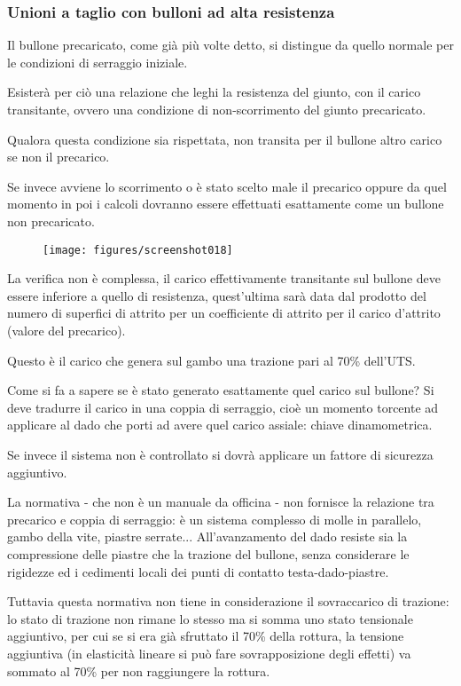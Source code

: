 \documentclass[a4paper, 15pt]{article}
\begin{document}
\subsubsection{Unioni a taglio con bulloni ad alta resistenza}
\begin{adjustwidth}{2in}{}	
	Il bullone precaricato, come già più volte detto, si distingue da quello normale per le condizioni di serraggio iniziale. 
	
	Esisterà per ciò una relazione che leghi la resistenza del giunto, con il carico transitante, ovvero una condizione di non-scorrimento del giunto precaricato. 
	
	Qualora questa condizione sia rispettata, non transita per il bullone altro carico se non il precarico. 
	
	Se invece avviene lo scorrimento o è stato scelto male il precarico oppure da quel momento in poi i calcoli dovranno essere effettuati esattamente come un bullone non precaricato. 
	\begin{figure}[H]
		\centering
		\texttt{[image: figures/screenshot018]}
		\label{fig:screenshot018}
	\end{figure}
	La verifica non è complessa, il carico  effettivamente transitante sul bullone deve essere inferiore a quello di resistenza, quest'ultima sarà data dal prodotto del numero di superfici di attrito per un coefficiente di attrito per il carico d'attrito (valore del precarico).
	
	Questo è il carico che genera sul gambo una trazione pari al 70\% dell'UTS.  \newline 
	
	Come si fa a sapere se è stato generato esattamente quel carico sul bullone? Si deve tradurre il carico in una coppia di serraggio, cioè un momento torcente ad applicare al dado che porti ad avere quel carico assiale: chiave dinamometrica. 
	
	Se invece il sistema non è controllato si dovrà applicare un fattore di sicurezza aggiuntivo. \newline 
	
	La normativa - che non è un manuale da officina - non fornisce la relazione tra precarico e coppia di serraggio: è un sistema complesso di molle in parallelo, gambo della vite, piastre serrate... All'avanzamento del dado resiste sia la compressione delle  piastre che la trazione del bullone, senza considerare le rigidezze ed i cedimenti locali dei punti di contatto testa-dado-piastre. \newline
	
	Tuttavia questa normativa non tiene in considerazione il sovraccarico di trazione: lo stato di trazione non rimane lo stesso ma si somma uno stato tensionale aggiuntivo, per cui se si era già sfruttato il 70\% della rottura, la tensione aggiuntiva (in elasticità lineare si può fare sovrapposizione degli effetti)  va sommato al 70\% per non raggiungere la rottura. 
\end{adjustwidth}
\newpage
\end{document}

